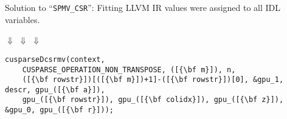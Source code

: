 \vspace{-1.8mm}
\caption{Solution to ``{\tt SPMV\_CSR}'': Fitting LLVM IR values were assigned
         to all IDL variables.\leftskip=0pt\rightskip=0pt}
\label{fig:spmvexample2}

\vspace{3.25mm}
{{\Huge$\Downarrow$}
\hspace{-2.73mm}\phantom{\bf~~~Code Generation: Insert~~}\hspace{-3.69mm}
{\Huge$\Downarrow$}
\hspace{-2.73mm}\phantom{\bf~~Arguments, Replace Code~~~}\hspace{-3.69mm}
{\Huge$\Downarrow$}}
\hspace{-3.4mm}

\vspace{-10.5mm}
{\phantom{\Huge$\Downarrow$}
\hspace{-2.73mm}{\bf~~~Code Generation: Insert~~}\hspace{-3.69mm}
\phantom{\Huge$\Downarrow$}
\hspace{-2.73mm}{\bf~~Arguments, Replace Code~~~}\hspace{-3.69mm}
\phantom{\Huge$\Downarrow$}}
\hspace{-3.4mm}
\vspace{-2.75mm}

\vspace{6.3mm}
\begin{lstlisting}[language=MyCpp, label={fig:spmvexample3}, caption=
   {GPU acceleration: Solution values are used to call ``{\tt cusparseDcsrmv}''
    backend.\leftskip=0pt\rightskip=0pt}]
cusparseDcsrmv(context,
    CUSPARSE_OPERATION_NON_TRANSPOSE, ([{\bf m}]), n,
    ([{\bf rowstr}])[([{\bf m}])+1]-([{\bf rowstr}])[0], &gpu_1, descr, gpu_([{\bf a}]),
    gpu_([{\bf rowstr}]), gpu_([{\bf colidx}]), gpu_([{\bf z}]), &gpu_0, gpu_([{\bf r}]));
\end{lstlisting}